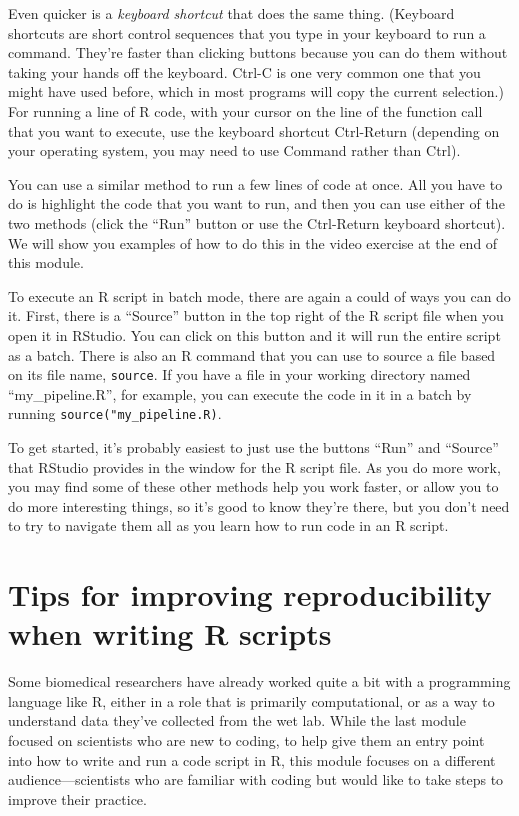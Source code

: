 \documentclass[]{tufte-book}
\begin{document}
Even quicker is a \emph{keyboard shortcut} that does the same thing. (Keyboard
shortcuts are short control sequences that you type in your keyboard to run a
command. They're faster than clicking buttons because you can do them without
taking your hands off the keyboard. Ctrl-C is one very common one that you might
have used before, which in most programs will copy the current selection.) For
running a line of R code, with your cursor on the line of the function call that
you want to execute, use the keyboard shortcut Ctrl-Return (depending on your
operating system, you may need to use Command rather than Ctrl).

You can use a similar method to run a few lines of code at once. All you have to
do is highlight the code that you want to run, and then you can use either of
the two methods (click the ``Run'' button or use the Ctrl-Return keyboard shortcut).
We will show you examples of how to do this in the video exercise at the end
of this module.

To execute an R script in batch mode, there are again a could of ways you can do
it. First, there is a ``Source'' button in the top right of the R script file when
you open it in RStudio. You can click on this button and it will run the entire
script as a batch. There is also an R command that you can use to source a file
based on its file name, \texttt{source}. If you have a file in your working directory
named ``my\_pipeline.R'', for example, you can execute the code in it in a batch by
running \texttt{source("my\_pipeline.R)}.

To get started, it's probably easiest to just use the buttons ``Run'' and ``Source''
that RStudio provides in the window for the R script file. As you do more work, you
may find some of these other methods help you work faster, or allow you to do
more interesting things, so it's good to know they're there, but you don't need
to try to navigate them all as you learn how to run code in an R script.

\section{Tips for improving reproducibility when writing R scripts}\label{module13a}

Some biomedical researchers have already worked quite a bit with a programming
language like R, either in a role that is primarily computational, or as a
way to understand data they've collected from the wet lab. While
the last module focused on scientists who are new to coding, to help give them
an entry point into how to write and run a code script in R, this module
focuses on a different audience---scientists who are familiar with coding but
would like to take steps to improve their practice.
\end{document}
